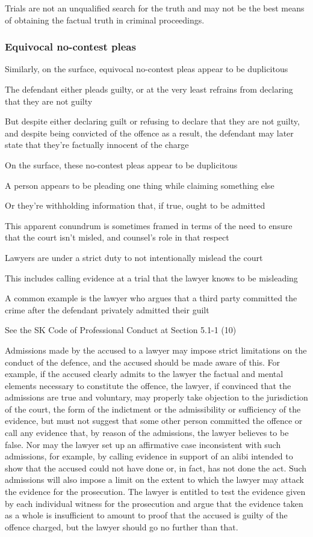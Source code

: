 Trials are not an unqualified search for the truth and may not be the best means of obtaining the factual truth in criminal proceedings.

\subsubsection{Equivocal no-contest pleas}

Similarly, on the surface, equivocal no-contest pleas appear to be duplicitous

The defendant either pleads guilty, or at the very least refrains from declaring that they are not guilty

But despite either declaring guilt or refusing to declare that they are not guilty, and despite being convicted of the offence as a result, the defendant may later state that they're factually innocent of the charge

On the surface, these no-contest pleas appear to be duplicitous

A person appears to be pleading one thing while claiming something else

Or they're withholding information that, if true, ought to be admitted

This apparent conundrum is sometimes framed in terms of the need to ensure that the court isn't misled, and counsel's role in that respect

Lawyers are under a strict duty to not intentionally mislead the court

This includes calling evidence at a trial that the lawyer knows to be misleading

A common example is the lawyer who argues that a third party committed the crime after the defendant privately admitted their guilt

See the SK Code of Professional Conduct at Section 5.1-1 (10)

Admissions made by the accused to a lawyer may impose strict limitations on the conduct of the defence, and the accused should be made aware of this. For example, if the accused clearly admits to the lawyer the factual and mental elements necessary to constitute the offence, the lawyer, if convinced that the admissions are true and voluntary, may properly take objection to the jurisdiction of the court, the form of the indictment or the admissibility or sufficiency of the evidence, but must not suggest that some other person committed the offence or call any evidence that, by reason of the admissions, the lawyer believes to be false. Nor may the lawyer set up an affirmative case inconsistent with such admissions, for example, by calling evidence in support of an alibi intended to show that the accused could not have done or, in fact, has not done the act. Such admissions will also impose a limit on the extent to which the lawyer may attack the evidence for the prosecution. The lawyer is entitled to test the evidence given by each individual witness for the prosecution and argue that the evidence taken as a whole is insufficient to amount to proof that the accused is guilty of the offence charged, but the lawyer should go no further than that.

